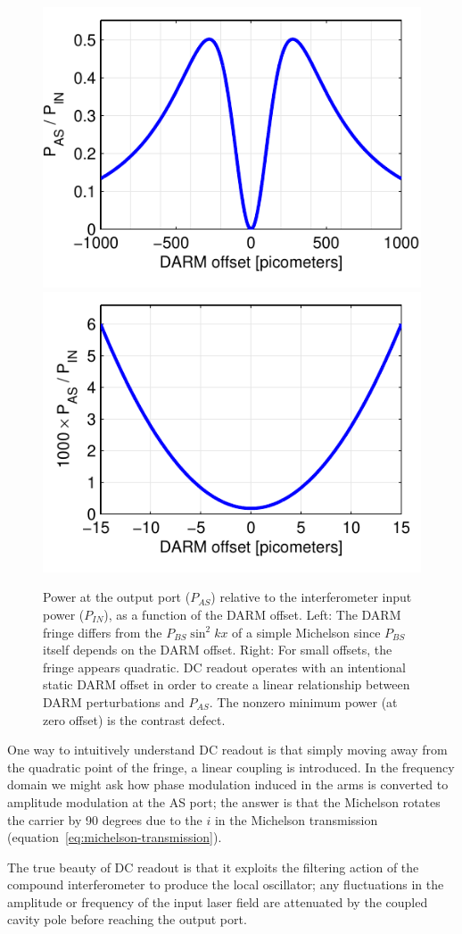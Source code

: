 \begin{figure}
\includegraphics[width=0.5\columnwidth]{figures/darmfringe-1000.pdf}
\includegraphics[width=0.5\columnwidth]{figures/darmfringe-15.pdf}
\caption[The DARM fringe]{Power at the output port ($P_{AS}$) relative
  to the interferometer input power ($P_{IN}$), as a function of the
  DARM offset.  Left: The DARM fringe differs from the $P_{BS} \sin^2
  kx$ of a simple Michelson since $P_{BS}$ itself depends on the DARM
  offset.  Right: For small offsets, the fringe appears quadratic.  DC
  readout operates with an intentional static DARM offset in order to
  create a linear relationship between DARM perturbations and
  $P_{AS}$.  The nonzero minimum power (at zero offset) is the
  contrast defect.}
\end{figure}

One way to intuitively understand DC readout is that simply moving
away from the quadratic point of the fringe, a linear coupling is
introduced.  In the frequency domain we might ask how phase modulation
induced in the arms is converted to amplitude modulation at the AS
port; the answer is that the Michelson rotates the carrier by 90
degrees due to the $i$ in the Michelson transmission
(equation~\ref{eq:michelson-transmission}).

The true beauty of DC readout is that it exploits the filtering
action of the compound interferometer to produce the local oscillator;
any fluctuations in the amplitude or frequency of the input laser
field are attenuated by the coupled cavity pole before reaching the
output port.

